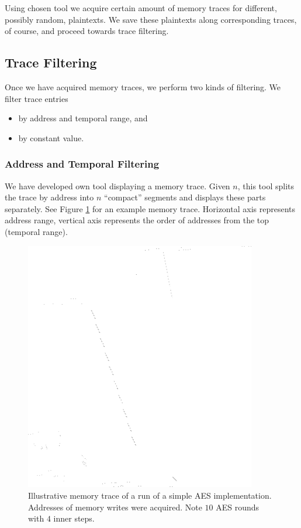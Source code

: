 Using chosen tool we acquire certain amount of memory traces for different, possibly random, plaintexts. We save these plaintexts along corresponding traces, of course, and proceed towards trace filtering.

\subsection{Trace Filtering}
\label{sec:filter}

Once we have acquired memory traces, we perform two kinds of filtering. We filter trace entries
\begin{itemize}
	\item by address and temporal range, and
	\item by constant value.
\end{itemize}

\subsubsection{Address and Temporal Filtering}

We have developed own tool displaying a memory trace. Given $n$, this tool splits the trace by address into $n$ ``compact'' segments and displays these parts separately. See Figure \ref{fig:memtrace} for an example memory trace. Horizontal axis represents address range, vertical axis represents the order of addresses from the top (temporal range).

\begin{figure}[h]
\begin{center}
	\includegraphics[width=0.9\textwidth]{./figures/memtrace/memtrace.png}
	\caption{Illustrative memory trace of a run of a simple AES implementation. Addresses of memory writes were acquired. Note $10$ AES rounds with $4$ inner steps.}
	\label{fig:memtrace}
\end{center}
\end{figure}

